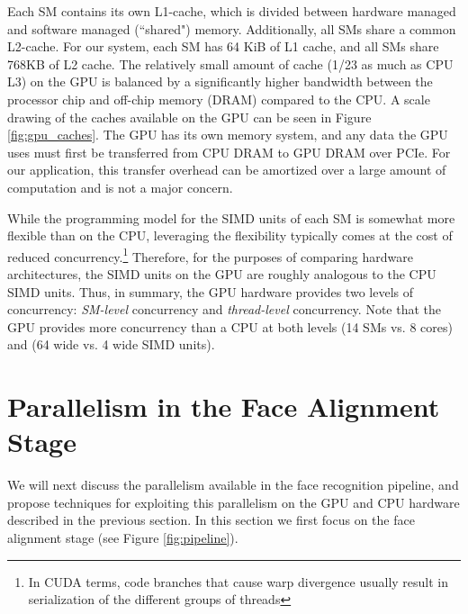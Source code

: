 Each SM contains its own L1-cache, which is divided between hardware managed
and software managed (``shared") memory.  Additionally, all SMs share a common
L2-cache.  For our system, each SM has 64 KiB of L1 cache, and all SMs share
768KB of L2 cache. 
The relatively small amount
of cache (1/23 as much as CPU L3) on the GPU is balanced by a significantly
higher bandwidth between the processor chip and off-chip memory (DRAM) compared
to the CPU.  A scale drawing of the caches available on the GPU can be seen in Figure \ref{fig:gpu_caches}.
The GPU has its own memory system, and any data the GPU uses must first be
transferred from CPU DRAM to GPU DRAM over PCIe.  For our application,
this transfer overhead can be amortized over a large amount of computation and is
not a major concern.

While the programming model for
the SIMD units of each SM is somewhat more flexible than on the CPU,
leveraging the flexibility typically comes at the cost of reduced concurrency.\footnote{
In CUDA terms, code branches that cause warp divergence usually
result in serialization of the different groups of threads}  Therefore, for
the purposes of comparing hardware architectures, the SIMD units on the GPU are
roughly analogous to the CPU SIMD units. Thus, in summary, the GPU hardware 
provides two levels of concurrency: {\em SM-level}
concurrency and {\em thread-level} concurrency.  Note that the GPU provides more
concurrency than a CPU at both levels (14 SMs vs. 8 cores) and (64 wide vs. 4 wide SIMD
units).


\section{Parallelism in the Face Alignment Stage}
\label{sec:alignment}

We will next discuss the parallelism available in the face recognition
pipeline, and propose techniques for exploiting this parallelism on the GPU and CPU hardware 
described in the previous section.  In this section we first focus on the
face alignment stage (see Figure \ref{fig:pipeline}).

